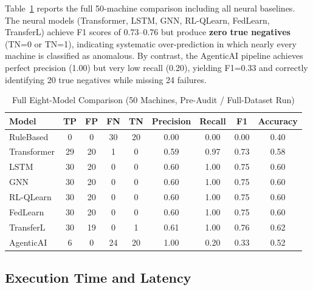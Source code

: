 Table~\ref{tab:full_cmp} reports the full 50-machine comparison including all neural baselines. The neural models (Transformer, LSTM, GNN, RL-QLearn, FedLearn, TransferL) achieve F1 scores of 0.73--0.76 but produce \textbf{zero true negatives} (TN=0 or TN=1), indicating systematic over-prediction in which nearly every machine is classified as anomalous. By contrast, the AgenticAI pipeline achieves perfect precision (1.00) but very low recall (0.20), yielding F1=0.33 and correctly identifying 20 true negatives while missing 24 failures.
\begin{table}[!htbp]
\centering
\caption{Full Eight-Model Comparison (50 Machines, Pre-Audit / Full-Dataset Run)}
\label{tab:full_cmp}
\begin{tabular}{lcccccccc}
\hline
\textbf{Model} & \textbf{TP} & \textbf{FP} & \textbf{FN} & \textbf{TN} & \textbf{Precision} & \textbf{Recall} & \textbf{F1} & \textbf{Accuracy} \\
\hline
RuleBased  & 0  & 0  & 30 & 20 & 0.00 & 0.00 & 0.00 & 0.40 \\
Transformer& 29 & 20 & 1  & 0  & 0.59 & 0.97 & 0.73 & 0.58 \\
LSTM       & 30 & 20 & 0  & 0  & 0.60 & 1.00 & 0.75 & 0.60 \\
GNN        & 30 & 20 & 0  & 0  & 0.60 & 1.00 & 0.75 & 0.60 \\
RL-QLearn  & 30 & 20 & 0  & 0  & 0.60 & 1.00 & 0.75 & 0.60 \\
FedLearn   & 30 & 20 & 0  & 0  & 0.60 & 1.00 & 0.75 & 0.60 \\
TransferL  & 30 & 19 & 0  & 1  & 0.61 & 1.00 & 0.76 & 0.62 \\
AgenticAI  & 6  & 0  & 24 & 20 & 1.00 & 0.20 & 0.33 & 0.52 \\
\hline
\end{tabular}
\end{table}
\subsection{Execution Time and Latency}

